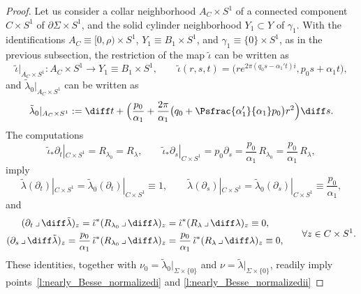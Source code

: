 \begin{proof}
Let us consider a collar neighborhood $A_C\times S^1$ of a connected component $C\times S^1$ of $\partial\Sigma \times S^1$, and the solid cylinder neighborhood $Y_1\subset Y$ of $\gamma_1$. With the identifications $A_C\equiv[0,\rho)\times S^1$, $Y_1\equiv B_1\times S^1$, and $\gamma_1\equiv\{0\}\times S^1$, as in the previous subsection, the restriction of the map $\tilde\iota$ can be written as
\[
\tilde\iota|_{A_C\times S^1}:A_C\times S^1\to Y_1\equiv B_1\times S^1,
\qquad
\tilde\iota(r,s,t)=\big( r e^{2\pi(q_0s-\alpha_1't)i} , p_0s+\alpha_1t \big),
\]
and $\tilde\lambda_0|_{A_C\times S^1}$ can be written as
\begin{equation}
\label{e:pull_back_lambda_0}
\tilde\lambda_0|_{A_C\times S^1}
:=
\diff t
+
\Big(\frac{p_0}{\alpha_1} +\frac{2\pi}{\alpha_1} \big( q_0+\Psfrac{\alpha_1'}{\alpha_1}p_0 \big) r^2\Big)\diff s.
\end{equation}
The computations
\[
\tilde\iota_*\partial_t|_{C\times S^1} =R_{\lambda_0}=R_\lambda,
\qquad
\tilde\iota_*\partial_s|_{C\times S^1} = p_0\partial_s = \frac{p_0}{\alpha_1}\, R_{\lambda_0}= \frac{p_0}{\alpha_1}\, R_\lambda,
\]
imply
\[
\tilde\lambda(\partial_t)|_{C\times S^1}=\tilde\lambda_0(\partial_t)|_{C\times S^1} \equiv 1,
\qquad
\tilde\lambda(\partial_s)|_{C\times S^1} = \tilde\lambda_0(\partial_s)|_{C\times S^1} \equiv \frac{p_0}{\alpha_1},
\]
and
\[
\begin{aligned}
(\partial_t\,\lrcorner\,\diff\tilde\lambda)_z = \tilde\iota^*(R_{\lambda_0}\,\lrcorner\,\diff\lambda)_z &= \tilde\iota^*(R_\lambda\,\lrcorner\,\diff\lambda)_z \equiv 0,\\
(\partial_s\,\lrcorner\,\diff\tilde\lambda)_z
=
\frac{p_0}{\alpha_1}\,\tilde\iota^*(R_{\lambda_0}\,\lrcorner\,\diff\lambda)_z
&=
\frac{p_0}{\alpha_1}\,\tilde\iota^*(R_\lambda\,\lrcorner\,\diff\lambda)_z \equiv 0,
\end{aligned}
\qquad\forall z\in C\times S^1.
\]
These identities, together with $\nu_0=\tilde\lambda_0|_{\Sigma\times\{0\}}$ and $\nu=\tilde\lambda|_{\Sigma\times\{0\}}$, readily imply points~\eqref{l:nearly_Besse_normalizedi} and \eqref{l:nearly_Besse_normalizedii}


\end{proof}

